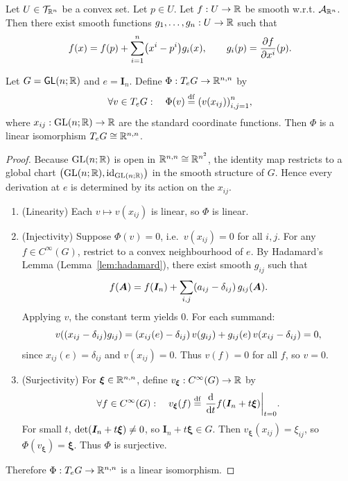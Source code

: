 \documentclass[11pt,reqno]{amsart}
\begin{document}
\begin{lemma}[Hadamard]\label{lem:hadamard}
  Let $U\in\mathcal{T}_{\mathbb{R}^n}$ be a convex set.
  Let $p\in U$. Let $f:U\to\mathbb{R}$ be smooth w.r.t. $\mathcal{A}_{\mathbb{R}^n}$.
  Then there exist smooth functions $g_1,\dots,g_n:U\to\mathbb{R}$ such that
  \[
  f(x) = f(p) + \sum_{i=1}^n\Br{x^i-p^i}g_i(x),
  \qquad
  g_i(p) = \frac{\partial f}{\partial x^i}(p).
  \]
\end{lemma}

\begin{lemma}\label{lem:gl-identification}
  Let $G=\operatorname{\mathsf{GL}}(n;\mathbb{R})$ and $e=\bm I_n$.
  Define $\Phi:T_e G\to\mathbb{R}^{n,n}$ by
  \[
    \forall v\in T_e G:\quad
    \Phi(v)\df\Br{v(x_{ij})}_{i,j=1}^n,
  \]
  where $x_{ij}:\operatorname{GL}(n;\mathbb{R})\to\mathbb{R}$ are the standard coordinate functions.
  Then $\Phi$ is a linear isomorphism $T_e G\cong\mathbb{R}^{n,n}$.
\end{lemma}
\begin{proof}
  Because $\operatorname{GL}(n;\mathbb{R})$ is open in $\mathbb{R}^{n,n}\cong\mathbb{R}^{n^2}$,
  the identity map restricts to a global chart
  $\Br{\GLset(n;\R),\id_{\GLset(n;\R)}}$ in the smooth structure of $G$.
  Hence every derivation at $e$ is determined by its action on the $x_{ij}$.

  \begin{enumerate}
  \item (Linearity) Each $v\mapsto v(x_{ij})$ is linear, so $\Phi$ is linear.

  \item (Injectivity) Suppose $\Phi(v)=0$, i.e.\ $v(x_{ij})=0$ for all $i,j$.
  For any $f\in C^\infty(G)$, restrict to a convex neighbourhood of $e$.
  By Hadamard's Lemma (Lemma~\ref{lem:hadamard}), there exist smooth $g_{ij}$ such that
  \[
    f(\bm A) = f(\bm I_n) + \sum_{i,j} \Br{a_{ij}-\delta_{ij}}\,g_{ij}(\bm A).
  \]
  Applying $v$, the constant term yields $0$.  For each summand:
  \[
    v\Br{\Br{x_{ij}-\delta_{ij}}g_{ij}}
    = \Br{x_{ij}(e)-\delta_{ij}}\,v(g_{ij}) + g_{ij}(e)\,v\Br{x_{ij}-\delta_{ij}}
    = 0,
  \]
  since $x_{ij}(e)=\delta_{ij}$ and $v(x_{ij})=0$.  Thus $v(f)=0$ for all $f$, so $v=0$.

  \item (Surjectivity) For $\bm\xi\in\mathbb{R}^{n,n}$, define
  $v_{\bm\xi}:C^\infty(G)\to\mathbb{R}$ by
  \[
    \forall f\in C^\infty(G):\quad
    v_{\bm\xi}(f)\df\eval{\frac{\dd}{\dd t} f(\bm I_n + t\bm\xi)}_{t=0}.
  \]
  For small $t$, $\det\Br{\bm I_n+t\bm\xi}\neq 0$, so $\bm I_n+t\bm\xi\in G$.
  Then $v_{\bm\xi}(x_{ij})=\xi_{ij}$, so $\Phi(v_{\bm\xi})=\bm\xi$.
  Thus $\Phi$ is surjective.
  \end{enumerate}
  Therefore $\Phi:T_e G\to\mathbb{R}^{n,n}$ is a linear isomorphism.
\end{proof}
\end{document}
